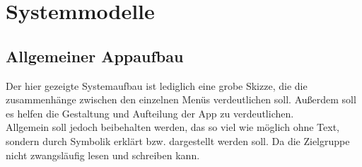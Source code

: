 \documentclass{scrartcl}
\begin{document}
\clearpage

\section{Systemmodelle}

\subsection{Allgemeiner Appaufbau}

Der hier gezeigte Systemaufbau ist lediglich eine grobe \glqq Skizze\grqq,
die die zusammenhänge zwischen den einzelnen Menüs verdeutlichen soll.
Außerdem soll es helfen die Gestaltung und Aufteilung der App zu verdeutlichen.\\
Allgemein soll jedoch beibehalten werden, das so viel wie möglich ohne Text, sondern durch Symbolik erklärt bzw. dargestellt werden soll. Da die Zielgruppe nicht zwangsläufig lesen und schreiben kann.
\end{document}
